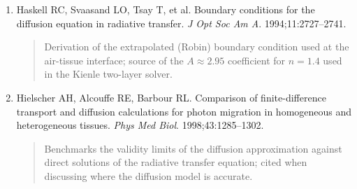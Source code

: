 \documentclass[12pt]{article}
\begin{document}
\begin{enumerate}
\item Haskell RC, Svaasand LO, Tsay T, et al. Boundary conditions for the diffusion equation in radiative transfer. \textit{J Opt Soc Am A}. 1994;11:2727--2741.
\begin{quote}
Derivation of the extrapolated (Robin) boundary condition used at the air-tissue interface; source of the $A \approx 2.95$ coefficient for $n=1.4$ used in the Kienle two-layer solver.
\end{quote}

\item Hielscher AH, Alcouffe RE, Barbour RL. Comparison of finite-difference transport and diffusion calculations for photon migration in homogeneous and heterogeneous tissues. \textit{Phys Med Biol}. 1998;43:1285--1302.
\begin{quote}
Benchmarks the validity limits of the diffusion approximation against direct solutions of the radiative transfer equation; cited when discussing where the diffusion model is accurate.
\end{quote}

\end{enumerate}
\end{document}
